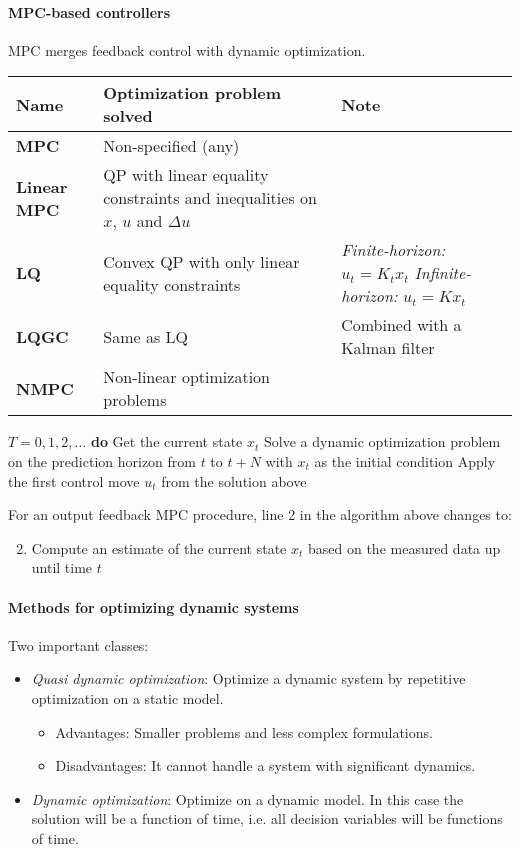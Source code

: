 \paragraph{MPC-based controllers} MPC merges feedback control with dynamic optimization.

\begin{tabularx}{\linewidth}{p{1.3cm} X X}
	\textbf{Name} & \textbf{Optimization problem solved} & \textbf{Note}\\
	\hline
	\textbf{MPC} & Non-specified (any) & \\
	\textbf{Linear MPC} & QP with linear equality constraints and inequalities on $x$, $u$ and $\Delta u$ & \\
	\textbf{LQ} & Convex QP with only linear equality constraints & \textit{Finite-horizon:} $u_t=K_t x_t$ \textit{Infinite-horizon:} $u_t=K x_t$\\
	\textbf{LQGC} & Same as LQ & Combined with a Kalman filter\\
	\textbf{NMPC} & Non-linear optimization problems &\\
\end{tabularx}

\begin{codebox}
\li \For $T = 0, 1, 2, \dots$ \textbf{do} \Indentmore
\li Get the current state $x_t$
\li Solve a dynamic optimization problem on
\zi the prediction horizon from $t$ to $t+N$
\zi with $x_t$ as the initial condition
\li Apply the first control move $u_t$ from
\zi the solution above \End
\end{codebox}

\noindent For an output feedback MPC procedure, line 2 in the algorithm above changes to:
%
{ \renewcommand\labelenumi{\theenumi}
\begin{enumerate}
    \setcounter{enumi}{1}
    \item Compute an estimate of the current state $\hat{x}_t$ based on the measured data up until time $t$ 
\end{enumerate}
}

\paragraph{Methods for optimizing dynamic systems} Two important classes:
\begin{itemize}[nolistsep,noitemsep]
    \item \textit{Quasi dynamic optimization}: Optimize a dynamic system by repetitive optimization on a static model.
    \begin{itemize}[nolistsep,noitemsep]
        \item Advantages: Smaller problems and less complex formulations.
        \item Disadvantages: It cannot handle a system with significant dynamics.
    \end{itemize}
    \item \textit{Dynamic optimization}: Optimize on a dynamic model. In this case the solution will be a function of time, i.e. all decision variables will be functions of time.
\end{itemize}

